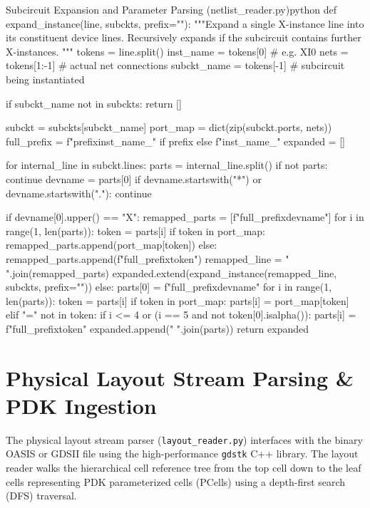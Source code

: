 \begin{thesiscode}{Subcircuit Expansion and Parameter Parsing (netlist\_reader.py)}{python}
def expand_instance(line, subckts, prefix=""):
    """Expand a single X-instance line into its constituent device lines.
    Recursively expands if the subcircuit contains further X-instances.
    """
    tokens = line.split()
    inst_name = tokens[0]           # e.g. XI0
    nets = tokens[1:-1]             # actual net connections
    subckt_name = tokens[-1]        # subcircuit being instantiated

    if subckt_name not in subckts:
        return []

    subckt = subckts[subckt_name]
    port_map = dict(zip(subckt.ports, nets))
    full_prefix = f"{prefix}{inst_name}_" if prefix else f"{inst_name}_"
    expanded = []

    for internal_line in subckt.lines:
        parts = internal_line.split()
        if not parts:
            continue
        devname = parts[0]
        if devname.startswith("*") or devname.startswith("."):
            continue

        if devname[0].upper() == "X":
            remapped_parts = [f"{full_prefix}{devname}"]
            for i in range(1, len(parts)):
                token = parts[i]
                if token in port_map:
                    remapped_parts.append(port_map[token])
                else:
                    remapped_parts.append(f"{full_prefix}{token}")
            remapped_line = " ".join(remapped_parts)
            expanded.extend(expand_instance(remapped_line, subckts, prefix=""))
        else:
            parts[0] = f"{full_prefix}{devname}"
            for i in range(1, len(parts)):
                token = parts[i]
                if token in port_map:
                    parts[i] = port_map[token]
                elif "=" not in token:
                    if i <= 4 or (i == 5 and not token[0].isalpha()):
                        parts[i] = f"{full_prefix}{token}"
            expanded.append(" ".join(parts))
    return expanded
\end{thesiscode}

\section[Layout Stream Ingestion]{Physical Layout Stream Parsing \& PDK Ingestion}
\label{sec:layout_ingestion}

The physical layout stream parser (\texttt{layout\_reader.py}) interfaces with the binary OASIS or GDSII file using the high-performance \texttt{gdstk} C++ library. The layout reader walks the hierarchical cell reference tree from the top cell down to the leaf cells representing PDK parameterized cells (PCells) using a depth-first search (DFS) traversal.

